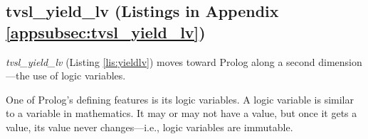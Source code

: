 

\subsection{tvsl\_yield\_lv (Listings in Appendix \ref{appsubsec:tvsl_yield_lv})} \label{subsec:tvsl_yield_lv}



\textit{tvsl\_yield\_lv} (Listing \ref{lis:yieldlv}) moves toward Prolog along a second dimension---the use of logic variables.

One of Prolog's defining features is its logic variables. A logic variable is similar to a variable in mathematics. It may or may not have a value, but once it gets a value, its value never changes---i.e., logic variables are immutable.

